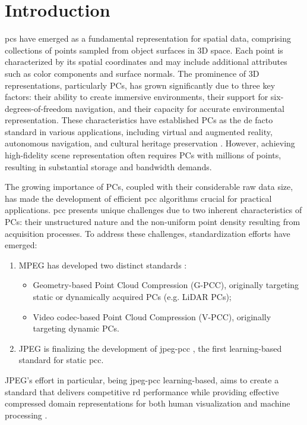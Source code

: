 \section{Introduction}
\label{sec:intro}
\glspl{pc} have emerged as a fundamental representation for spatial data, comprising collections of points sampled from object surfaces in 3D space. Each point is characterized by its spatial coordinates and may include additional attributes such as color components and surface normals. The prominence of 3D representations, particularly PCs, has grown significantly due to three key factors: their ability to create immersive environments, their support for six-degrees-of-freedom navigation, and their capacity for accurate environmental representation. These characteristics have established PCs as the de facto standard in various applications, including virtual and augmented reality, autonomous navigation, and cultural heritage preservation \cite{camuffo2022recent}.  However, achieving high-fidelity scene representation often requires PCs with millions of points, resulting in substantial storage and bandwidth demands. 

The growing importance of PCs, coupled with their considerable raw data size, has made the development of efficient \gls{pcc} algorithms crucial for practical applications.
\IEEEpubidadjcol 
\gls{pcc} presents unique challenges due to two inherent characteristics of PCs: their unstructured nature and the non-uniform point density resulting from acquisition processes. To address these challenges, standardization efforts have emerged:
\begin{enumerate}
    \item MPEG has developed two distinct standards \cite{graziosi2020overview}:
    \begin{itemize}
        \item Geometry-based Point Cloud Compression (G-PCC), originally targeting static or dynamically acquired PCs (e.g. LiDAR PCs);
        \item Video codec-based Point Cloud Compression (V-PCC), originally targeting dynamic PCs.
    \end{itemize}
    \item JPEG is finalizing the development of \gls{jpeg-pcc} \cite{guarda2024jpeg}, the first learning-based standard for static \gls{pcc}.
\end{enumerate}

JPEG's effort in particular, being \gls{jpeg-pcc} learning-based, aims to create a standard that delivers competitive \gls{rd} performance while providing effective compressed domain representations for both human visualization and machine processing \cite{seleem2023deep}.

